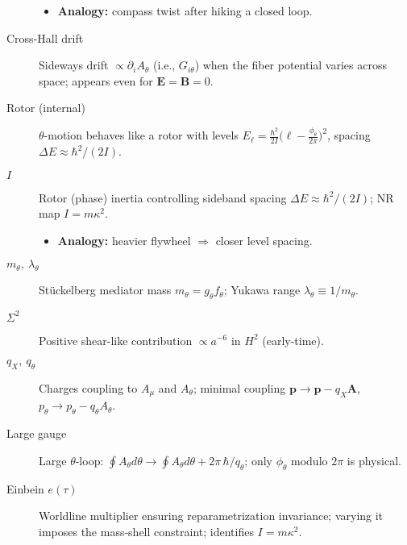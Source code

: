 \begin{description}
    \begin{itemize}
      \item \textbf{Analogy:} compass twist after hiking a closed loop.
    \end{itemize}
  \item[Cross-Hall drift] Sideways drift $\propto\partial_i A_\theta$ (i.e., $G_{i\theta}$) when the fiber potential varies across space; appears even for $\mathbf E=\mathbf B=0$.
  \item[Rotor (internal)] $\theta$-motion behaves like a rotor with levels
    $\displaystyle E_\ell=\frac{\hbar^2}{2I}\Big(\ell-\frac{\phi_\theta}{2\pi}\Big)^2$, spacing $\Delta E\approx \hbar^2/(2I)$.
  \item[$I$] Rotor (phase) inertia controlling sideband spacing $\Delta E\approx \hbar^2/(2I)$; NR map $I=m\kappa^2$.
    \begin{itemize}
      \item \textbf{Analogy:} heavier flywheel $\Rightarrow$ closer level spacing.
    \end{itemize}
  \item[$m_\theta,\ \lambda_\theta$] St\"uckelberg mediator mass $m_\theta=g_\theta f_\theta$; Yukawa range $\lambda_\theta\equiv 1/m_\theta$.
  \item[$\Sigma^2$] Positive shear-like contribution $\propto a^{-6}$ in $H^2$ (early-time).
  \item[$q_X,\ q_\theta$] Charges coupling to $A_\mu$ and $A_\theta$; minimal coupling $\mathbf p\to\mathbf p-q_X\mathbf A$, $p_\theta\to p_\theta-q_\theta A_\theta$.
  \item[Large gauge] Large $\theta$-loop: $\oint A_\theta d\theta\to \oint A_\theta d\theta+2\pi\,\hbar/q_\theta$; only $\phi_\theta$ modulo $2\pi$ is physical.
  \item[Einbein $e(\tau)$] Worldline multiplier ensuring reparametrization invariance; varying it imposes the mass-shell constraint; identifies $I=m\kappa^2$.
\end{description}
